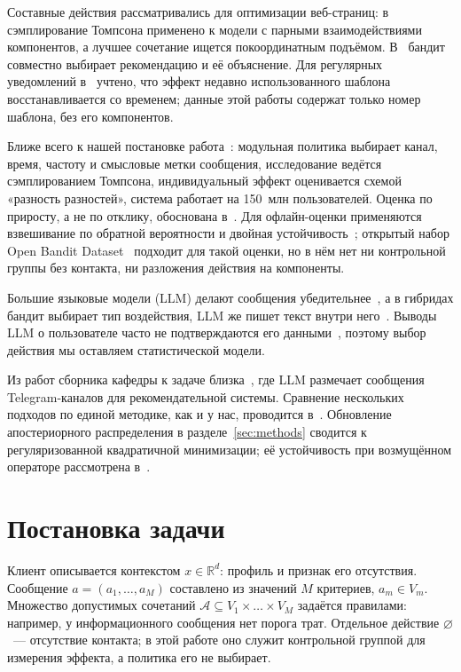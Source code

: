\documentclass{misisarticle}
\begin{document}
Составные действия рассматривались для оптимизации веб-страниц: в~\cite{hill2017} сэмплирование Томпсона применено к модели с парными взаимодействиями компонентов, а лучшее сочетание ищется покоординатным подъёмом. В~\cite{mcinerney2018} бандит совместно выбирает рекомендацию и её объяснение. Для регулярных уведомлений в~\cite{yancey2020} учтено, что эффект недавно использованного шаблона восстанавливается со временем; данные этой работы содержат только номер шаблона, без его компонентов.

Ближе всего к нашей постановке работа~\cite{abboud2025}: модульная политика выбирает канал, время, частоту и смысловые метки сообщения, исследование ведётся сэмплированием Томпсона, индивидуальный эффект оценивается схемой «разность разностей», система работает на 150~млн пользователей. Оценка по приросту, а не по отклику, обоснована в~\cite{sato2019, kunzel2019}. Для офлайн-оценки применяются взвешивание по обратной вероятности и двойная устойчивость~\cite{dudik2011}; открытый набор Open Bandit Dataset~\cite{saito2021} подходит для такой оценки, но в нём нет ни контрольной группы без контакта, ни разложения действия на компоненты.

Большие языковые модели (LLM) делают сообщения убедительнее~\cite{matz2024}, а в гибридах бандит выбирает тип воздействия, LLM же пишет текст внутри него~\cite{song2025, hofer2026}. Выводы LLM о пользователе часто не подтверждаются его данными~\cite{fostiropoulos2026, zhang2026}, поэтому выбор действия мы оставляем статистической модели.

Из работ сборника кафедры к задаче близка~\cite{sosedka2024}, где LLM размечает сообщения Telegram-каналов для рекомендательной системы. Сравнение нескольких подходов по единой методике, как и у нас, проводится в~\cite{chetvertkov2026, zaitsev2026}. Обновление апостериорного распределения в разделе~\ref{sec:methods} сводится к регуляризованной квадратичной минимизации; её устойчивость при возмущённом операторе рассмотрена в~\cite{artemyeva2022}.

\section{Постановка задачи}

Клиент описывается контекстом $x \in \mathbb{R}^{d}$: профиль и признак его отсутствия. Сообщение $a = (a_1, \dots, a_M)$ составлено из значений $M$ критериев, $a_m \in V_m$. Множество допустимых сочетаний $\mathcal{A} \subseteq V_1 \times \dots \times V_M$ задаётся правилами: например, у информационного сообщения нет порога трат. Отдельное действие $\varnothing$~--- отсутствие контакта; в этой работе оно служит контрольной группой для измерения эффекта, а политика его не выбирает.
\end{document}
